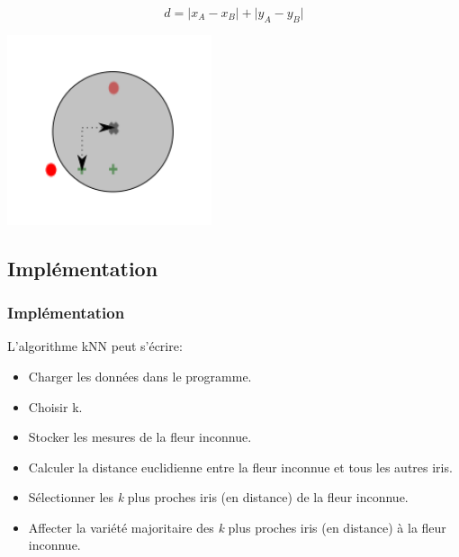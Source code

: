 \documentclass[svgnames,11pt]{beamer}
\begin{document}
\begin{frame}

    $$d=\lvert x_A-x_B\rvert+\lvert y_A-y_B\rvert$$
    \begin{center}
        \centering
        \includegraphics[width=6cm]{ressources/manhattan.png}
        \label{IMG}
    \end{center}
\end{frame}
\subsection{Implémentation}
\begin{frame}
    \frametitle{Implémentation}
    L'algorithme kNN peut s'écrire:
    \begin{itemize}
        \item Charger les données dans le programme.
        \item Choisir k.
        \item Stocker les mesures de la fleur inconnue.
        \item Calculer la distance euclidienne entre la fleur inconnue et tous les autres iris.
        \item Sélectionner les \emph{k} plus proches iris (en distance) de la fleur inconnue.
        \item Affecter la variété majoritaire  des \emph{k} plus proches iris (en distance) à la fleur inconnue.
    \end{itemize}


\end{frame}
\end{document}
